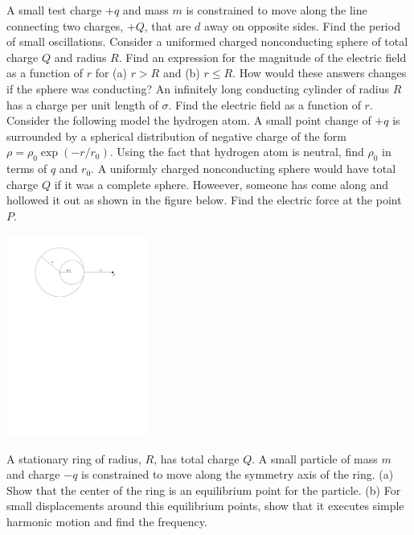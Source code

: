 \documentclass[12pt]{article}
\begin{document}
\newpage
\noindent A small test charge $+q$ and mass $m$ is constrained to move along the line connecting two charges, $+Q$, that are $d$ away on opposite sides.  Find the period of small oscillations.   
\newpage
\noindent Consider a uniformed charged nonconducting sphere of total charge $Q$ and radius $R$.  Find an expression for the magnitude of the electric field as a function of $r$ for (a) $r>R$ and (b) $r\le R$.  How would these answers changes if the sphere was conducting?
\newpage
\noindent An infinitely long conducting cylinder of radius $R$ has a charge per unit length of $\sigma$.  Find the electric field as a function of $r$.  
\newpage
\noindent Consider the following model the hydrogen atom.  A small point change of $+q$ is surrounded by a spherical distribution of negative charge of the form $\rho = \rho_0 \exp(-r/r_0)$.  Using the fact that hydrogen atom is neutral, find $\rho_0$ in terms of $q$ and $r_0$.
\newpage
\noindent A uniformly charged nonconducting sphere would have total charge $Q$ if it was a complete sphere.  Howeever, someone has come along and hollowed it out as shown in the figure below.  Find the electric force at the point $P$.

\includegraphics[width=0.35\textwidth]{sphere.pdf}

\newpage
\noindent A stationary ring of radius, $R$, has total charge $Q$.  A small particle of mass $m$ and charge $-q$ is constrained to move along the symmetry axis of the ring.  (a) Show that the center of the ring is an equilibrium point for the particle. (b) For small displacements around this equilibrium points, show that it executes simple harmonic motion and find the frequency.    
\end{document}
